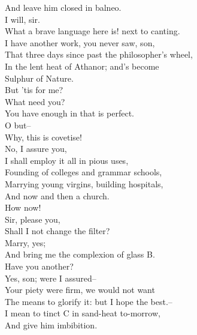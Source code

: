\documentclass{memoir}
\begin{document}
\begin{drama*}
 And leave him closed in balneo.\\
\facespeaks {} I will, sir.\\
\surlyspeaks {} What a brave language here is! next to canting.\\
\subtlespeaks  I have another work, you never saw, son,\\
 That three days since past the philosopher's wheel,\\
 In the lent heat of Athanor; and's become\\
 Sulphur of Nature.\\
\mammonspeaks {} But 'tis for me?\\
\subtlespeaks {} What need you?\\
 You have enough in that is perfect.\\
\mammonspeaks {} O but--\\
\subtlespeaks  Why, this is covetise!\\
\mammonspeaks {} No, I assure you,\\
 I shall employ it all in pious uses,\\
 Founding of colleges and grammar schools,\\
 Marrying young virgins, building hospitals,\\
 And now and then a church.\\
\subtlespeaks {} How now!\\
\facespeaks {} Sir, please you,\\
 Shall I not change the filter?\\
\subtlespeaks {} Marry, yes;\\
 And bring me the complexion of glass B.\\
\mammonspeaks  Have you another?\\
\subtlespeaks {} Yes, son; were I assured--\\
 Your piety were firm, we would not want\\
 The means to glorify it: but I hope the best.--\\
 I mean to tinct C in sand-heat to-morrow,\\
 And give him imbibition.\\

\end{drama*}
\end{document}
